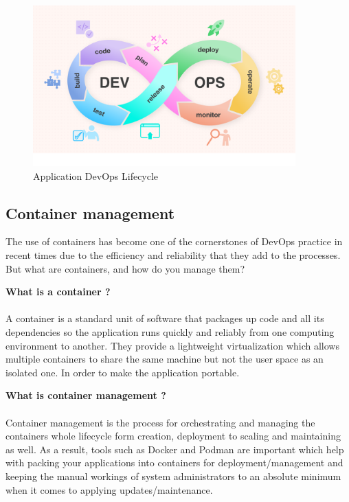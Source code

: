 \begin{figure}[H]
  \centering
  \includegraphics[width=0.9\textwidth]{src/assets/chapters/devopslifecycle.png}
  \caption{Application DevOps Lifecycle}
  \label{fig:application-devops-lifecycle}
\end{figure}

\subsection{Container management}
The use of containers has become one of the cornerstones of DevOps practice in recent times due to the efficiency and reliability that they add to the processes. But what are containers, and how do you manage them?

\textbf{What is a container ?}
\paragraph*{}
A container is a standard unit of software that packages up code and all its dependencies so the application runs quickly and reliably from one computing environment to another. They provide a lightweight virtualization which allows multiple containers to share the same machine but not the user space as an isolated one. 
In order to make the application portable.

\textbf{What is container management ?}
\paragraph*{}
Container management is the process for orchestrating and managing the containers whole lifecycle form creation, deployment to scaling and maintaining as well. As a result, tools such as Docker and  Podman are important which help with packing your applications into containers for deployment/management and keeping the manual workings of system administrators to an absolute minimum when it comes to applying updates/maintenance.

